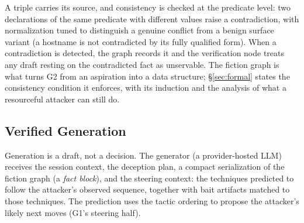 A triple carries its source, and consistency is checked at the predicate
level: two declarations of the same predicate with different values raise
a contradiction, with normalization tuned to distinguish a genuine
conflict from a benign surface variant (a hostname is not contradicted by
its fully qualified form). When a contradiction is detected, the graph
records it and the verification node treats any draft resting on the
contradicted fact as unservable. The fiction graph is what turns G2 from
an aspiration into a data structure; \S\ref{sec:formal} states the
consistency condition it enforces, with its induction and the analysis
of what a resourceful attacker can still do.

\subsection{Verified Generation}
\label{sec:verify}
Generation is a draft, not a decision. The generator (a provider-hosted
LLM) receives the session context, the deception plan, a compact
serialization of the fiction graph (a \emph{fact block}), and the
steering context: the \attck techniques predicted to follow the
attacker's observed sequence, together with bait artifacts matched to
those techniques. The prediction uses the \attck tactic ordering to
propose the attacker's likely next moves (G1's steering half).

